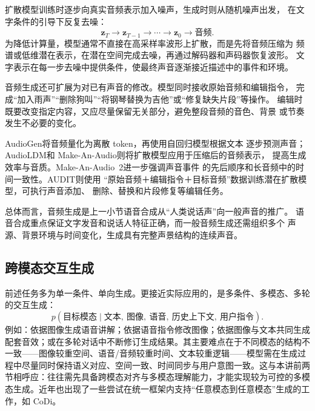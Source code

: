 扩散模型训练时逐步向真实音频表示加入噪声，生成时则从随机噪声出发，
在文字条件的引导下反复去噪：
\begin{equation}
  \mathbf{z}_{T}
  \longrightarrow
  \mathbf{z}_{T-1}
  \longrightarrow \cdots \longrightarrow
  \mathbf{z}_{0}
  \longrightarrow
  \text{音频}.
\end{equation}
为降低计算量，模型通常不直接在高采样率波形上扩散，而是先将音频压缩为
频谱或低维潜在表示，在潜在空间完成去噪，再通过解码器和声码器恢复波形。
文字表示在每一步去噪中提供条件，使最终声音逐渐接近描述中的事件和环境。


音频生成还可扩展为对已有声音的修改。模型同时接收原始音频和编辑指令，
完成“加入雨声”“删除狗叫”“将钢琴替换为吉他”或“修复缺失片段”等操作。
编辑时既要改变指定内容，又应尽量保留无关部分，避免整段音频的音色、背景
或节奏发生不必要的变化。


AudioGen\cite{audiogen}将音频量化为离散 token，再使用自回归模型根据文本
逐步预测声音；AudioLDM\cite{audioldm}和
Make-An-Audio\cite{makeanaudio}则将扩散模型应用于压缩后的音频表示，
提高生成效率与音质。Make-An-Audio~2\cite{makeanaudio2}进一步强调声音事件
的先后顺序和长音频中的时间一致性。AUDIT\cite{audit}则使用
“原始音频＋编辑指令＋目标音频”数据训练潜在扩散模型，可执行声音添加、
删除、替换和片段修复等编辑任务。

总体而言，音频生成是上一小节语音合成从“人类说话声”向一般声音的推广。
语音合成重点保证文字发音和说话人特征正确，而一般音频生成还需组织多个
声源、背景环境与时间变化，生成具有完整声景结构的连续声音。

\subsection{跨模态交互生成}
\label{sub:anytoany}

前述任务多为单一条件、单向生成。更接近实际应用的，是多条件、多模态、多轮的交互生成：
\begin{equation}
  p(\text{目标模态}\mid \text{文本},\ \text{图像},\ \text{语音},\ \text{历史上下文},\ \text{用户指令}).
\end{equation}
例如：依据图像生成语音讲解；依据语音指令修改图像；依据图像与文本共同生成配套音效；或在多轮对话中不断修订生成结果。其主要难点在于不同模态的结构不一致——图像较重空间、语音/音频较重时间、文本较重逻辑——模型需在生成过程中尽量同时保持语义对应、空间一致、时间同步与用户意图一致。这与本讲前两节相呼应：往往需先具备跨模态对齐与多模态理解能力，才能实现较为可控的多模态生成。近年也出现了一些尝试在统一框架内支持“任意模态到任意模态”生成的工作，如 CoDi\cite{codi}。


